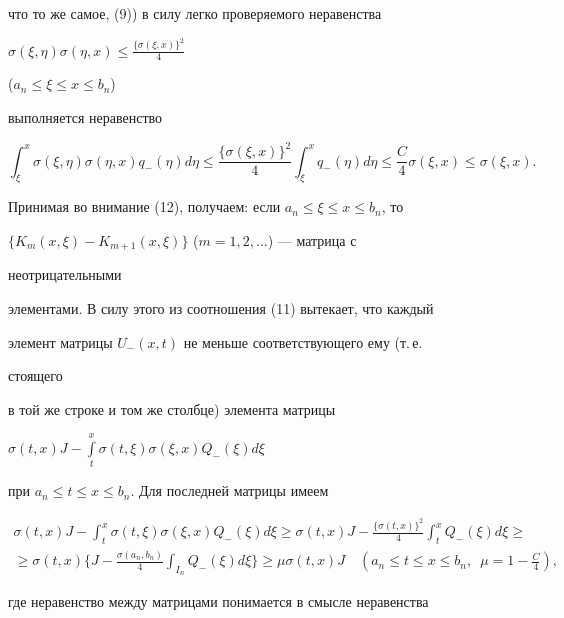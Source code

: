 \begin{pf}
что то же самое, (9)) в силу легко проверяемого неравенства 


$\sigma(\xi,\eta)\sigma(\eta,x)\le\frac{\{\sigma(\xi,x)\}^2}{4}$ 


($a_n\le\xi\le x\le b_n$) 


выполняется неравенство 


\begin{equation} 


\int^x_\xi \sigma(\xi,\eta)\sigma(\eta,x)q_-(\eta)d\eta\le 


\frac{\{\sigma(\xi,x)\}^2}{4}\int^x_\xi q_-(\eta)d\eta\le 


\frac{C}{4}\sigma(\xi,x)\le\sigma(\xi,x). 


\end{equation} 


Принимая во внимание (12), получаем: если $a_n\le\xi\le x\le b_n$, то 


$\{K_m(x,\xi)-K_{m+1}(x,\xi)\}$ ($m=1,2,\dotsc$) --- матрица с 


неотрицательными 


элементами. В силу этого из соотношения (11) вытекает, что каждый 


элемент матрицы $U_-(x,t)$ не меньше соответствующего ему (т.\,е. 


стоящего 


в той же строке и том же столбце) элемента матрицы 


$\sigma(t,x)J-\int\limits^x_t\sigma(t,\xi)\sigma(\xi,x)Q_-(\xi)d\xi$ 


при $a_n\le t\le x\le b_n$. Для последней матрицы имеем 


\begin{multline*} 


\sigma(t,x)J-\int^x_t \sigma(t,\xi)\sigma(\xi,x) 


Q_-(\xi)d\xi\ge \sigma(t,x)J-\frac{\{\sigma(t,x)\}^2}{4} 


\int^x_t Q_-(\xi)d\xi\ge \\ 


% 


\ge \sigma(t,x)\bigg\{J-\frac{\sigma(a_n,b_n)}{4} 


\int_{I_n}Q_-(\xi)d\xi\bigg\}\ge\mu\sigma(t,x)J\quad 


(a_n\le t\le x\le b_n,\ \; \mu=1-\tfrac{C}{4}), 


\end{multline*} 


где неравенство между матрицами понимается в смысле неравенства 



\end{pf}
